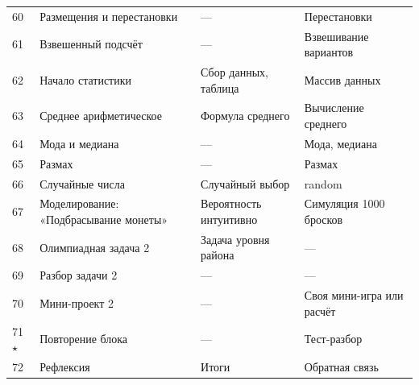 \documentclass[12pt,a4paper]{article}
\newcommand{\ml}[1]{\textcolor{blue!65!black}{\small #1}}
\begin{document}
\begin{longtable}{C{0.9cm}L{4.3cm}L{4.1cm}L{4.5cm}}
60 & Размещения и перестановки & --- & \ml{Перестановки}\\
61 & Взвешенный подсчёт & --- & \ml{Взвешивание вариантов}\\
62 & Начало статистики & Сбор данных, таблица & \ml{Массив данных}\\
63 & Среднее арифметическое & Формула среднего & \ml{Вычисление среднего}\\
64 & Мода и медиана & --- & \ml{Мода, медиана}\\
65 & Размах & --- & \ml{Размах}\\
66 & Случайные числа & Случайный выбор & \ml{random}\\
67 & Моделирование: «Подбрасывание монеты» & Вероятность интуитивно & \ml{Симуляция 1000 бросков}\\
68 & Олимпиадная задача 2 & Задача уровня района & ---\\
69 & Разбор задачи 2 & --- & ---\\
70 & Мини-проект 2 & --- & Своя мини-игра или расчёт\\
71 $\star$ & Повторение блока & --- & Тест-разбор\\
72 & Рефлексия & Итоги & Обратная связь\\
\midrule


\end{longtable}
\end{document}
